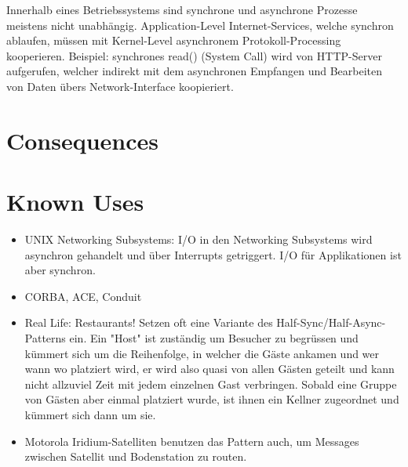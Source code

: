 Innerhalb eines Betriebssystems sind synchrone und asynchrone Prozesse meistens nicht unabhängig. Application-Level Internet-Services, welche synchron ablaufen, müssen mit Kernel-Level asynchronem Protokoll-Processing kooperieren. Beispiel: synchrones read() (System Call) wird von HTTP-Server aufgerufen, welcher indirekt mit dem asynchronen Empfangen und Bearbeiten von Daten übers Network-Interface koopieriert.

\section{Consequences}
\begin{itemize}
\end{itemize}

\section{Known Uses}
\begin{itemize}
  \item UNIX Networking Subsystems: I/O in den Networking Subsystems wird asynchron gehandelt und über Interrupts getriggert. I/O für Applikationen ist aber synchron.
  \item CORBA, ACE, Conduit
  \item Real Life: Restaurants! Setzen oft eine Variante des Half-Sync/Half-Async-Patterns ein. Ein "Host" ist zuständig um Besucher zu begrüssen und kümmert sich um die Reihenfolge, in welcher die Gäste ankamen und wer wann wo platziert wird, er wird also quasi von allen Gästen geteilt und kann nicht allzuviel Zeit mit jedem einzelnen Gast verbringen. Sobald eine Gruppe von Gästen aber einmal platziert wurde, ist ihnen ein Kellner zugeordnet und kümmert sich dann um sie.
  \item Motorola Iridium-Satelliten benutzen das Pattern auch, um Messages zwischen Satellit und Bodenstation zu routen.
\end{itemize}

